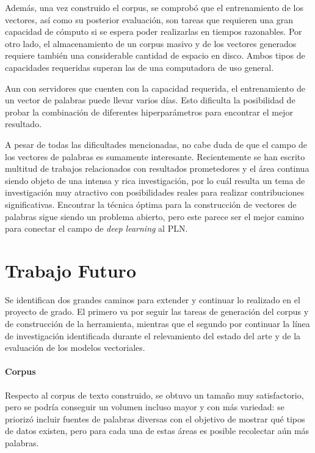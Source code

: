 Además, una vez construido el corpus, se comprobó que el entrenamiento de los vectores, así como su
posterior evaluación, son tareas que requieren una gran capacidad de cómputo si se espera poder
realizarlas en tiempos razonables. Por otro lado, el almacenamiento de un corpus masivo y de los
vectores generados requiere también una considerable cantidad de espacio en disco. Ambos tipos de
capacidades requeridas superan las de una computadora de uso general.

Aun con servidores que cuenten con la capacidad requerida, el entrenamiento de un vector de palabras
puede llevar varios días. Esto dificulta la posibilidad de probar la combinación de diferentes
hiperparámetros para encontrar el mejor resultado.

A pesar de todas las dificultades mencionadas, no cabe duda de que el campo de los vectores de palabras
es sumamente interesante. Recientemente se han escrito multitud de trabajos relacionados con resultados
prometedores y el área continua siendo objeto de una intensa y rica investigación, por lo cuál resulta un
tema de investigación muy atractivo con posibilidades reales para realizar contribuciones significativas.
Encontrar la técnica óptima para la construcción de vectores de palabras sigue siendo un problema abierto,
pero este parece ser el mejor camino para conectar el campo de \textit{deep learning} al PLN\@.


\section{Trabajo Futuro}

Se identifican dos grandes caminos para extender y continuar lo realizado en el proyecto de
grado. El primero va por seguir las tareas de generación del corpus y de construcción de la
herramienta, mientras que el segundo por continuar la línea de investigación identificada durante el
relevamiento del estado del arte y de la evaluación de los modelos vectoriales.


\paragraph{Corpus}

Respecto al corpus de texto construido, se obtuvo un tamaño muy satisfactorio, pero se podría
conseguir un volumen incluso mayor y con más variedad: se priorizó incluir fuentes de palabras
diversas con el objetivo de mostrar qué tipos de datos existen, pero para cada una de estas áreas es
posible recolectar aún más palabras.

